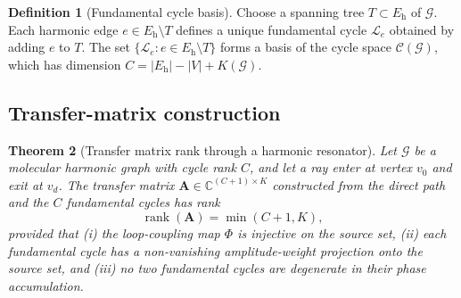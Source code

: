 \documentclass[11pt,twocolumn,a4paper]{article}
\newtheorem{theorem}{Theorem}[section]
\theoremstyle{definition}
\newtheorem{definition}[theorem]{Definition}
\theoremstyle{remark}
\newcommand{\Cmat}{\mathbf{A}}
\newcommand{\Graph}{\mathcal{G}}
\newcommand{\Loop}{\mathcal{L}}
\newcommand{\VertexSet}{V}
\newcommand{\HarmSet}{E_{\mathrm{h}}}
\newcommand{\CycleSpace}{\mathcal{C}}
\newcommand{\rank}{\operatorname{rank}}
\begin{document}
\begin{definition}[Fundamental cycle basis]
\label{def:cycle_basis}
Choose a spanning tree $T \subset \HarmSet$ of $\Graph$. Each harmonic edge $e \in \HarmSet \setminus T$ defines a unique fundamental cycle $\Loop_e$ obtained by adding $e$ to $T$. The set $\{\Loop_e : e \in \HarmSet \setminus T\}$ forms a basis of the cycle space $\CycleSpace(\Graph)$, which has dimension $C = |\HarmSet| - |\VertexSet| + K(\Graph)$.
\end{definition}

\subsection{Transfer-matrix construction}

\begin{theorem}[Transfer matrix rank through a harmonic resonator]
\label{thm:rank}
Let $\Graph$ be a molecular harmonic graph with cycle rank $C$, and let a ray enter at vertex $v_0$ and exit at $v_d$. The transfer matrix $\Cmat \in \mathbb{C}^{(C+1) \times K}$ constructed from the direct path and the $C$ fundamental cycles has rank
\begin{equation}
\rank(\Cmat) = \min(C + 1, K),
\end{equation}
provided that (i) the loop-coupling map $\Phi$ is injective on the source set, (ii) each fundamental cycle has a non-vanishing amplitude-weight projection onto the source set, and (iii) no two fundamental cycles are degenerate in their phase accumulation.
\end{theorem}
\end{document}
